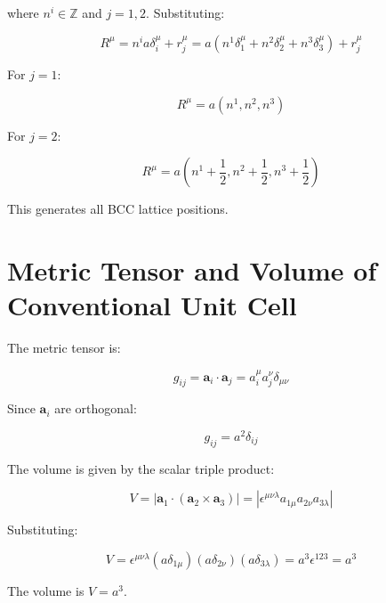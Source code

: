 \documentclass[a4paper,12pt]{article}
\newcommand{\bvec}[1]{\mathbf{#1}} %
\newcommand{\eps}{\epsilon} %
\newcommand{\delt}{\delta} %
\begin{document}
	where \(n^i \in \mathbb{Z}\) and \(j = 1, 2\). Substituting:
	
	\begin{equation}
		R^\mu = n^i a \delt_i^\mu + r_j^\mu = a (n^1 \delt_1^\mu + n^2 \delt_2^\mu + n^3 \delt_3^\mu) + r_j^\mu
	\end{equation}
	
	For \(j = 1\):
	
	\begin{equation}
		R^\mu = a (n^1, n^2, n^3)
	\end{equation}
	
	For \(j = 2\):
	
	\begin{equation}
		R^\mu = a \left( n^1 + \frac{1}{2}, n^2 + \frac{1}{2}, n^3 + \frac{1}{2} \right)
	\end{equation}
	
	This generates all BCC lattice positions.
	
	\section{Metric Tensor and Volume of Conventional Unit Cell}
	
	The metric tensor is:
	
	\begin{equation}
		g_{ij} = \bvec{a}_i \cdot \bvec{a}_j = a_i^\mu a_j^\nu \delt_{\mu\nu}
	\end{equation}
	
	Since \(\bvec{a}_i\) are orthogonal:
	
	\begin{equation}
		g_{ij} = a^2 \delt_{ij}
	\end{equation}
	
	The volume is given by the scalar triple product:
	
	\begin{equation}
		V = |\bvec{a}_1 \cdot (\bvec{a}_2 \times \bvec{a}_3)| = |\eps^{\mu\nu\lambda} a_{1\mu} a_{2\nu} a_{3\lambda}|
	\end{equation}
	
	Substituting:
	
	\begin{equation}
		V = \eps^{\mu\nu\lambda} (a \delt_{1\mu}) (a \delt_{2\nu}) (a \delt_{3\lambda}) = a^3 \eps^{123} = a^3
	\end{equation}
	
	The volume is \(V = a^3\).
	
\end{document}
